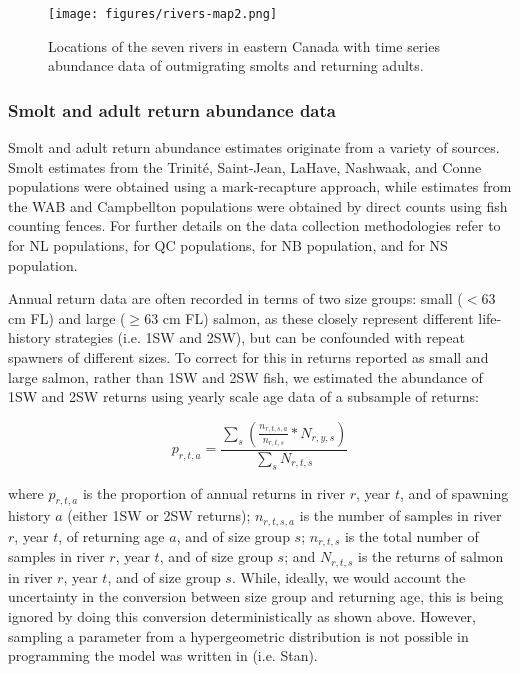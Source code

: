 \documentclass[12pt]{article}
\begin{document}
\begin{figure}[htbp] \centering
    \texttt{[image: figures/rivers-map2.png]}
    \caption{Locations of the seven rivers in eastern Canada with time series abundance data of outmigrating smolts and 
    returning adults.} \label{fig:map} 
\end{figure}

\subsubsection*{Smolt and adult return abundance data}

Smolt and adult return abundance estimates originate from a variety of
sources. Smolt estimates from the Trinit\'{e}, Saint-Jean, LaHave, Nashwaak,
and Conne populations were obtained using a mark-recapture approach, while
estimates from the WAB and Campbellton populations were obtained by direct
counts using fish counting fences.
For further details on the data collection methodologies refer to 
\citet{Dempson1991, Venoitt2018} for NL populations, 
\citet{April2018}  for QC populations,
\citet{Jones2014} for NB population,
and \citet{Gibson2009} for NS population. 

Annual return data are often recorded in terms of two size groups: small ($< 63$ cm
FL) and large ($\geq 63$ cm FL) salmon, as these closely represent different
life-history strategies (i.e. 1SW and 2SW), but can be confounded with repeat
spawners of different sizes. To correct for this in returns 
reported as small and large salmon, rather than 1SW and 2SW fish, we estimated the abundance
of 1SW and 2SW returns using yearly scale age data of a subsample of returns:

\begin{equation}
    p_{r,t,a} = \frac{\sum_{s}{(\frac{n_{r,t,s,a}}{n_{r,t,s}} * N_{r,y,s})}}{\sum_{s}{N_{r,t,s}}}
\end{equation}

where $p_{r,t,a}$ is the proportion of annual returns in river $r$, year $t$,
and of spawning history $a$ (either 1SW or 2SW returns); $n_{r,t,s,a}$ is the
number of samples in river $r$, year $t$, of returning age $a$, and of size
group $s$; $n_{r,t,s}$ is the total number of samples in river $r$, year $t$,
and of size group $s$; and $N_{r,t,s}$ is the returns of salmon
in river $r$, year $t$, and of size group $s$.
While, ideally, we would account the uncertainty in the conversion between
size group and returning age, this is being ignored by doing this conversion
deterministically as shown above. However, sampling a parameter from a
hypergeometric distribution is not possible in programming the model was
written in (i.e. Stan).
\end{document}
